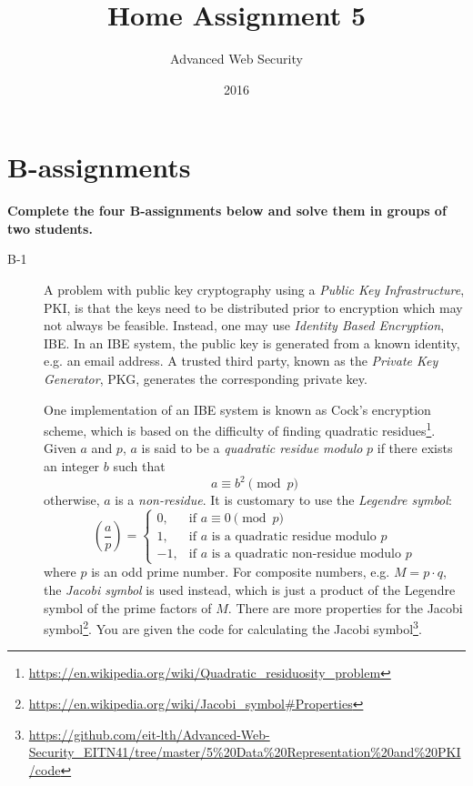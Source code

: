 \documentclass{article}
\begin{document}
\title{Home Assignment 5}
\author{Advanced Web Security}
\date{2016}

\maketitle

\section*{B-assignments}
\textbf{Complete the four B-assignments below and solve them in groups of two students.}

\begin{description}

	\item[B-1]{A problem with public key cryptography using a \emph{Public Key Infrastructure}, PKI, is that
    the keys need to be distributed prior to encryption which may not always be feasible.
    Instead, one may use \emph{Identity Based Encryption}, IBE. In an IBE system, the public key is generated
    from a known identity, e.g. an email address. A trusted third party, known as the \emph{Private Key Generator}, PKG,
    generates the corresponding private key.
    
    One implementation of an IBE system is known as Cock's encryption scheme,
    which is based on the difficulty of finding quadratic 
    residues\footnote{\url{https://en.wikipedia.org/wiki/Quadratic_residuosity_problem}}.
    Given $a$ and $p$, $a$ is said to be a \emph{quadratic residue modulo} $p$ if there exists an integer $b$
    such that
    \[
    a \equiv b^2 \pmod p
    \]
    otherwise, $a$ is a \emph{non-residue}.
    It is customary to use the \emph{Legendre symbol}:
    \[
    \left(\frac{a}{p}\right) = 
    \begin{cases}
    0, & \text{if $a \equiv 0 \pmod p$}\\
    1, & \text{if $a$ is a quadratic residue modulo $p$}\\
    -1, & \text{if $a$ is a quadratic non-residue modulo $p$}
    \end{cases}
    \]
    where $p$ is an odd prime number. For composite numbers, e.g. $M = p \cdot q$, the \emph{Jacobi symbol} is used
    instead, which is just a product of the Legendre symbol of the prime factors of $M$.
    There are more properties for the Jacobi symbol\footnote{\url{https://en.wikipedia.org/wiki/Jacobi_symbol\#Properties}}. 
	You are given the code for calculating the Jacobi symbol\footnote{\url{https://github.com/eit-lth/Advanced-Web-Security_EITN41/tree/master/5\%20Data\%20Representation\%20and\%20PKI/code}}.
    
}
\end{description}
\end{document}
